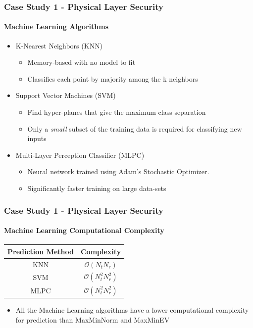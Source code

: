 \documentclass{beamer}
\begin{document}
\begin{frame}
    \frametitle{Case Study 1 - Physical Layer Security}
    \framesubtitle{Machine Learning Algorithms}    
    
    \begin{itemize}
    \item K-Nearest Neighbors (KNN)
    \begin{itemize}
        \item Memory-based with no model to fit
        \item Classifies each point by majority among the k neighbors
    \end{itemize}
    \item Support Vector Machines (SVM)
    \begin{itemize}
        \item Find hyper-planes that give the maximum class separation
        \item Only a \emph{small} subset of the training data is required for classifying new inputs
    \end{itemize}
    \item Multi-Layer Perception Classifier (MLPC)   
    \begin{itemize}
    \item Neural network trained using Adam's Stochastic Optimizer.
    \item Significantly faster training on large data-sets
    \end{itemize}
    \end{itemize}
\end{frame}

\begin{frame}
\frametitle{Case Study 1 - Physical Layer Security}
\framesubtitle{Machine Learning Computational Complexity}
 \begin{table}
     \begin{tabular}{c|c}
         Prediction Method & Complexity \\
        \hline     
         KNN & $\mathcal{O}(N_t N_r)$\\[5pt]    
         SVM & $\mathcal{O}(N_t^2N_r^2)$\\[5pt]
         MLPC &  $\mathcal{O}(N_t^2N_r^2)$
     \end{tabular}
 \end{table}
 \begin{itemize}
     \item All the Machine Learning algorithms have a lower computational complexity for prediction than MaxMinNorm and MaxMinEV
 \end{itemize}
\end{frame}
\end{document}
